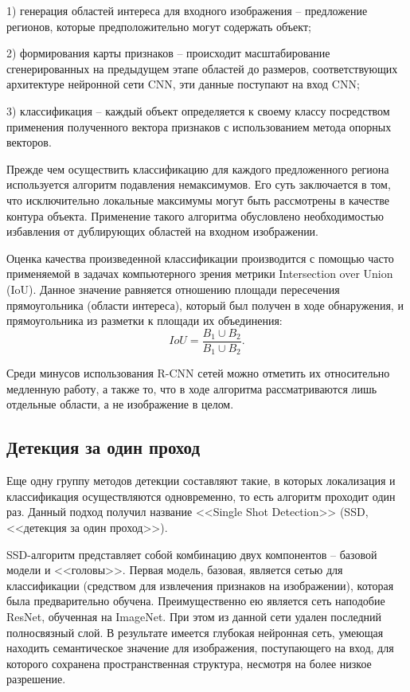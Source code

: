 \documentclass[14pt,a4paper]{extarticle}
\begin{document}
1) генерация областей интереса для входного изображения -- предложение регионов, которые предположительно могут содержать объект;

2) формирования карты признаков -- происходит масштабирование сгенерированных на предыдущем этапе областей до размеров, соответствующих архитектуре нейронной сети CNN, эти данные поступают на вход CNN;

3) классификация -- каждый объект определяется к своему классу посредством применения полученного вектора признаков с использованием метода опорных векторов.

Прежде чем осуществить классификацию для каждого предложенного региона используется алгоритм подавления немаксимумов. Его суть заключается в том, что исключительно локальные максимумы могут быть рассмотрены в качестве контура объекта. Применение такого алгоритма обусловлено необходимостью избавления от дублирующих областей на входном изображении.

Оценка качества произведенной классификации производится с помощью часто применяемой в задачах компьютерного зрения метрики Intersection over Union (IoU). Данное значение равняется отношению площади пересечения прямоугольника (области интереса), который был получен в ходе обнаружения, и  прямоугольника из разметки к площади их объединения:
\begin{equation}
IoU = \dfrac{B_1 \cup B_2}{B_1 \cup B_2}.
\end{equation}

Среди минусов использования R-CNN сетей можно отметить их относительно медленную работу, а также то, что в ходе алгоритма рассматриваются лишь отдельные области, а не изображение в целом.

\subsection{Детекция за один проход}
Еще одну группу методов детекции составляют такие, в которых локализация и классификация осуществляются одновременно, то есть алгоритм проходит один раз. Данный подход получил название <<Single Shot Detection>> (SSD, <<детекция за один проход>>). 

SSD-алгоритм представляет собой комбинацию двух компонентов -- базовой модели и <<головы>>. Первая модель, базовая, является сетью для классификации (средством для извлечения признаков на изображении), которая была предварительно обучена. Преимущественно ею является сеть наподобие ResNet, обученная на ImageNet. При этом из данной сети удален последний полносвязный слой. В результате имеется глубокая нейронная сеть, умеющая находить семантическое значение для изображения, поступающего на вход, для которого сохранена пространственная структура, несмотря на более низкое разрешение. 
\end{document}
